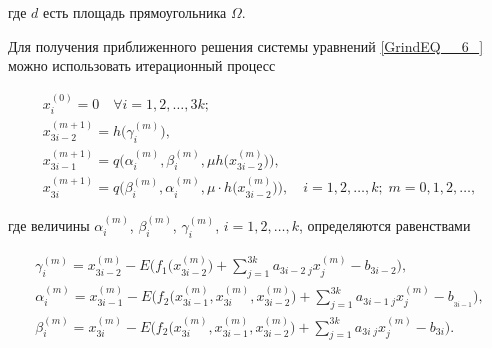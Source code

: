 где $d$ есть площадь прямоугольника $\Omega $.



Для получения приближенного решения системы уравнений \eqref{GrindEQ__6_} можно использовать итерационный процесс

\begin{equation} 

\label{GrindEQ__8_} 

\begin{array}{l} 

x_{i}^{(0)}=0\quad \forall i= 1, 2, \dots, 3k; 

\\[2mm] 

x_{3i-2}^{(m+1)} =h\bigl(\gamma _{i}^{(m)} \bigr) ,

\\[2mm] 

x_{3i-1}^{(m+1)} =q\bigl(\alpha _{i}^{(m)} ,\beta _{i}^{(m)} ,\mu  h\bigl(x_{3i-2}^{(m)} \bigr)\bigr) ,

\\[2mm] 

x_{3i}^{(m+1)} =q\bigl(\beta _{i}^{(m)} ,\alpha _{i}^{(m)} ,\mu \cdot h\bigl(x_{3i-2}^{(m)} \bigr)\bigr),\quad 

i= 1, 2, \dots, k;\;  m=0, 1, 2,\dots , 

\end{array}

\end{equation}

где величины $\alpha _{i}^{(m)}$, $\beta _{i}^{(m)} $, $\gamma _{i}^{(m)} $, $i=1, 2, \dots, k$, определяются равенствами

\begin{equation} 

\label{GrindEQ__9_} 

\begin{array}{l} 

\displaystyle 

\gamma _{i}^{(m)} =x_{3i-2}^{(m)} -E\biggl(f_{1} \bigl(x_{3i-2}^{(m)} \bigr)+\sum _{j=1}^{3k}a_{3i-2\; j} x_{j}^{(m)} -b_{3i-2}  \biggr),

\\[2mm] 

\displaystyle 

\alpha _{i}^{(m)} =x_{3i-1}^{(m)} -E\biggl(f_{2} \bigl(x_{3i-1}^{(m)} ,x_{3i}^{(m)} ,x_{3i-2}^{(m)} \bigr)+

\sum _{j=1}^{3k}a_{3i-1\; j} x_{j}^{(m)} -b_{_{3i-1} }  \biggr),

\\[2mm] 

\displaystyle 

\beta _{i}^{(m)} =x_{3i}^{(m)}-E\biggl(f_{2} \bigl(x_{3i}^{(m)} ,x_{3i-1}^{(m)} ,x_{3i-2}^{(m)} \bigr)+\sum _{j=1}^{3k}a_{3i\; j} x_{j}^{(m)}-b_{3i}  \biggr).

\end{array}

\end{equation}



